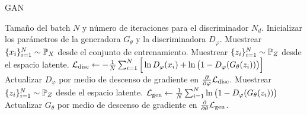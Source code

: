 {{{\begin{algorithm}[tbhp]
    \caption{GAN}\label{alg:GAN}
    \begin{algorithmic}
        \Require Tamaño del batch $N$ y número de iteraciones para el discriminador $N_d$.
        \State Inicializar los parámetros de la generadora $G_\theta$ y la discriminadora $D_\varphi$.
        \State Muestrear $\{x_i\}_{i=1}^{N} \sim \Prob_X$ desde el conjunto de entrenamiento.
        \State Muestrear $\{z_i\}_{i=1}^{N} \sim \Prob_Z$ desde el espacio latente.
        \State $\cL_{\mathrm{disc}} \gets -\frac{1}{N}\sum_{i=1}^{N} \Big[ \ln D_\varphi(x_i) + \ln \qty\big(1 - D_\varphi(G_\theta(z_i))) \Big]$
        \State Actualizar $D_\varphi$ por medio de descenso de gradiente en $\pdv{\varphi} \cL_{\mathrm{disc}}$.
        \EndFor
        \State Muestrear $\{z_i\}_{i=1}^{N} \sim \Prob_Z$ desde el espacio latente.
        \State $\cL_{\mathrm{gen}} \gets \frac{1}{N}\sum_{i=1}^{N} \ln \qty\big(1 - D_\varphi(G_\theta(z_i)))$
        \State Actualizar $G_\theta$ por medio de descenso de gradiente en $\pdv{\theta} \mathcal{L}_{\mathrm{gen}}$.
        \EndWhile
    \end{algorithmic}
\end{algorithm}

}}}
